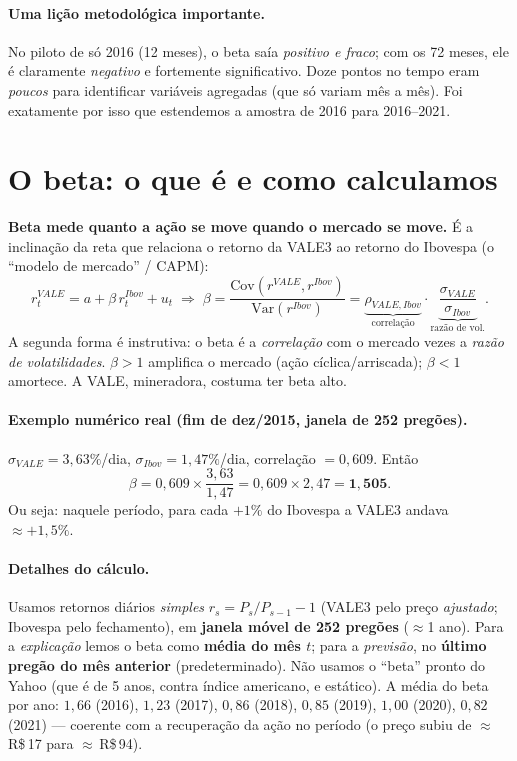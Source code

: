 \documentclass[11pt]{article}
\begin{document}
\paragraph{Uma lição metodológica importante.} No piloto de só 2016 (12 meses), o
beta saía \emph{positivo e fraco}; com os 72 meses, ele é claramente \emph{negativo}
e fortemente significativo. Doze pontos no tempo eram \emph{poucos} para identificar
variáveis agregadas (que só variam mês a mês). Foi exatamente por isso que estendemos
a amostra de 2016 para 2016--2021.

\section{O beta: o que é e como calculamos}

\textbf{Beta mede quanto a ação se move quando o mercado se move.} É a inclinação da
reta que relaciona o retorno da VALE3 ao retorno do Ibovespa (o ``modelo de mercado''
/ CAPM):
\begin{equation}
r^{VALE}_t = a + \beta\,r^{Ibov}_t + u_t
\;\Longrightarrow\;
\beta=\frac{\mathrm{Cov}(r^{VALE},r^{Ibov})}{\mathrm{Var}(r^{Ibov})}
=\underbrace{\rho_{VALE,Ibov}}_{\text{correlação}}\cdot
\underbrace{\frac{\sigma_{VALE}}{\sigma_{Ibov}}}_{\text{razão de vol.}}.
\label{eq:beta}
\end{equation}
A segunda forma é instrutiva: o beta é a \emph{correlação} com o mercado vezes a
\emph{razão de volatilidades}. $\beta>1$ amplifica o mercado (ação cíclica/arriscada);
$\beta<1$ amortece. A VALE, mineradora, costuma ter beta alto.

\paragraph{Exemplo numérico real (fim de dez/2015, janela de 252 pregões).}
$\sigma_{VALE}=3{,}63\%$/dia, $\sigma_{Ibov}=1{,}47\%$/dia, correlação $=0{,}609$.
Então
\[
\beta = 0{,}609 \times \frac{3{,}63}{1{,}47} = 0{,}609 \times 2{,}47 = \mathbf{1{,}505}.
\]
Ou seja: naquele período, para cada $+1\%$ do Ibovespa a VALE3 andava $\approx +1{,}5\%$.

\paragraph{Detalhes do cálculo.} Usamos retornos diários \emph{simples}
$r_s=P_s/P_{s-1}-1$ (VALE3 pelo preço \emph{ajustado}; Ibovespa pelo fechamento), em
\textbf{janela móvel de 252 pregões} ($\approx$1 ano). Para a \emph{explicação} lemos o
beta como \textbf{média do mês $t$}; para a \emph{previsão}, no \textbf{último pregão do
mês anterior} (predeterminado). Não usamos o ``beta''
pronto do Yahoo (que é de 5 anos, contra índice americano, e estático). A média do
beta por ano: $1{,}66$ (2016), $1{,}23$ (2017), $0{,}86$ (2018), $0{,}85$ (2019),
$1{,}00$ (2020), $0{,}82$ (2021) --- coerente com a recuperação da ação no período (o
preço subiu de $\approx$\,R\$\,17 para $\approx$\,R\$\,94).
\end{document}
